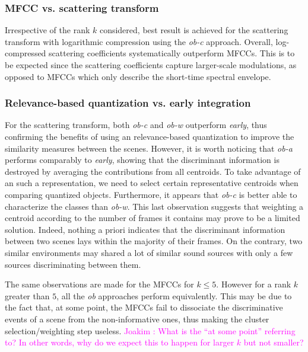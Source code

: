 \documentclass[journal]{IEEEtran}
\makeatletter
\newcommand*{\vs}{vs.\@\xspace}
\newcommand{\ja}[1]{\textcolor{magenta}{Joakim : #1}}
\makeatother
\begin{document}
\subsubsection*{MFCC \vs scattering transform}

Irrespective of the rank $k$ considered, best result is achieved for the scattering transform with logarithmic compression using the \emph{ob-c} approach. Overall, log-compressed scattering coefficients systematically outperform MFCCs. This is to be expected since the scattering coefficients capture larger-scale modulations, as opposed to MFCCs which only describe the short-time spectral envelope.

\subsubsection*{Relevance-based quantization \vs early integration}

For the scattering transform, both \emph{ob-c} and \emph{ob-w} outperform \emph{early}, thus confirming the benefits of using an relevance-based quantization to improve the similarity measures between the scenes. However, it is worth noticing that \emph{ob-a} performs comparably to \emph{early}, showing that the discriminant information is destroyed by averaging the contributions from all centroids. To take advantage of an such a representation, we need to select certain representative centroids when comparing quantized objects. Furthermore, it appears that \emph{ob-c} is better able to characterize the classes than \emph{ob-w}. This last observation suggests that weighting a centroid according to the number of frames it contains may prove to be a limited solution. Indeed, nothing a priori indicates that the discriminant information between two scenes lays within the majority of their frames. On the contrary, two similar environments may shared a lot of similar sound sources with only a few sources discriminating between them.

The same observations are made for the MFCCs for $k\leq5$. However for a rank $k$ greater than $5$, all the \emph{ob} approaches perform equivalently. This may be due to the fact that, at some point, the MFCCs fail to dissociate the discriminative events of a scene from the non-informative ones, thus making the cluster selection/weighting step useless. \ja{What is the ``at some point'' referring to? In other words, why do we expect this to happen for larger $k$ but not smaller?}
	
\end{document}
